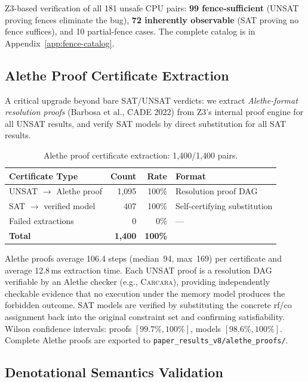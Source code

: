 \documentclass[11pt]{article}
\begin{document}
Z3-based verification of all 181 unsafe CPU pairs:
\textbf{99 fence-sufficient} (UNSAT proving fences eliminate the bug),
\textbf{72 inherently observable} (SAT proving no fence suffices),
and 10 partial-fence cases.
The complete catalog is in Appendix~\ref{app:fence-catalog}.

\subsection{Alethe Proof Certificate Extraction}
\label{sec:alethe-proofs}

A critical upgrade beyond bare SAT/UNSAT verdicts: we extract
\emph{Alethe-format resolution proofs} (Barbosa et al., CADE 2022)
from Z3's internal proof engine for all UNSAT results, and verify
SAT models by direct substitution for all SAT results.

\begin{table}[ht]
\centering
\caption{Alethe proof certificate extraction: 1{,}400/1{,}400 pairs.}
\label{tab:alethe-proofs}
\small
\begin{tabular}{lrrl}
\toprule
\textbf{Certificate Type} & \textbf{Count} & \textbf{Rate} & \textbf{Format} \\
\midrule
UNSAT $\to$ Alethe proof  & 1{,}095 & 100\% & Resolution proof DAG \\
SAT $\to$ verified model  & 407     & 100\% & Self-certifying substitution \\
Failed extractions        & 0       & 0\%   & --- \\
\midrule
\textbf{Total}            & \textbf{1{,}400} & \textbf{100\%} & \\
\bottomrule
\end{tabular}
\end{table}

\noindent
Alethe proofs average 106.4 steps (median~94, max~169) per certificate
and average 12.8\,ms extraction time.
Each UNSAT proof is a resolution DAG verifiable by an Alethe checker
(e.g., \textsc{Carcara}), providing independently checkable evidence
that no execution under the memory model produces the forbidden outcome.
SAT models are verified by substituting the concrete rf/co assignment
back into the original constraint set and confirming satisfiability.
Wilson confidence intervals: proofs $[99.7\%, 100\%]$,
models $[98.6\%, 100\%]$.
Complete Alethe proofs are exported to \texttt{paper\_results\_v8/alethe\_proofs/}.

\subsection{Denotational Semantics Validation}
\label{sec:denotational-semantics}
\end{document}
